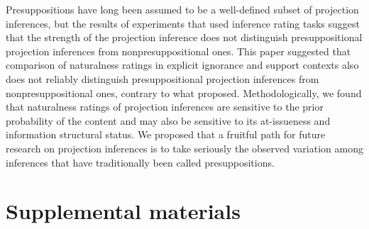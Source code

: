 \documentclass[11pt,fleqn]{article}
\newcommand{\6}{\mbox{$[\hspace*{-.6mm}[$}}
\newcommand{\9}{\mbox{$]\hspace*{-.6mm}]$}}
\begin{document}
Presuppositions have long been assumed to be a well-defined subset of projection inferences, but the results of experiments that used inference rating tasks suggest that the strength of the projection inference does not distinguish presuppositional projection inferences from nonpresuppositional ones. This paper suggested that comparison of naturalness ratings in explicit ignorance and support contexts also does not reliably distinguish presuppositional projection inferences from nonpresuppositional ones, contrary to what \citealt{mandelkern-etal2020} proposed. Methodologically, we found that naturalness ratings of projection inferences are sensitive to the prior probability of the content and may also be sensitive to its at-issueness and information structural status. We proposed that a fruitful path for future research on projection inferences is to take seriously the observed variation among inferences that have traditionally been called presuppositions.




%


\newpage

\section*{Supplemental materials}
\end{document}
